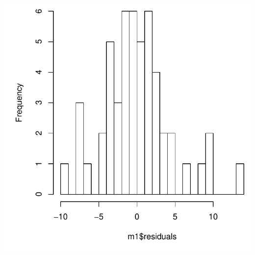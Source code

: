 \documentclass{beamer}\usepackage[]{graphicx}\usepackage[]{color}
\newenvironment{knitrout}{}{} %
\renewenvironment{knitrout}{\setlength{\topsep}{0mm}}{}
\begin{document}
\begin{frame}[fragile]
\begin{columns}[b]
\begin{knitrout}
\includegraphics[width=0.8\linewidth]{figure/unnamed-chunk-2-2} 

\end{knitrout}

\end{columns}

\end{frame}
\end{document}
